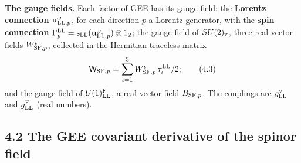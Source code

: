 \documentclass[
  10pt,
]{article}
\begin{document}
\textbf{The gauge fields.} Each factor of GEE has its gauge field: the
\textbf{Lorentz connection} \(\mathbf u^\omega_{{\rm LL},p}\), for each
direction \(p\) a Lorentz generator, with the \textbf{spin connection}
\(\Gamma^{\rm LL}_p=\mathsf s_{\rm LL}(\mathbf u^\omega_{{\rm LL},p})\otimes\mathsf 1_2\);
the gauge field of \(SU(2)_{\rm v}\), three real vector fields
\(W^\iota_{{\rm SF},p}\), collected in the Hermitian traceless matrix
\[\mathsf W_{{\rm SF},p}=\sum_{\iota=1}^3W^\iota_{{\rm SF},p}\,\tau^{\rm LL}_\iota/2;\tag{4.3}\]
and the gauge field of \(U(1)^{\rm F}_{\rm LL}\), a real vector field
\(B_{{\rm SF},p}\). The couplings are \(g^{\rm v}_{\rm LL}\) and
\(g^{\rm F}_{\rm LL}\) (real numbers).

\hypertarget{the-gee-covariant-derivative-of-the-spinor-field}{%
\subsection{4.2 The GEE covariant derivative of the spinor
field}\label{the-gee-covariant-derivative-of-the-spinor-field}}
\end{document}
